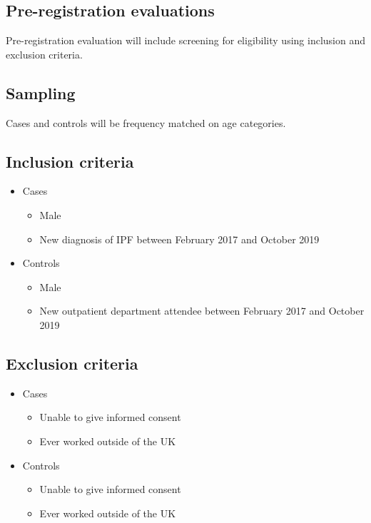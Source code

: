 \documentclass[a4paper,10pt]{article}
\newcommand{\studystart}{February 2017 }
\newcommand{\studyend}{October 2019 }
\begin{document}
\subsection{Pre-registration evaluations}
Pre-registration evaluation will include screening for eligibility using inclusion and exclusion criteria.

\subsection{Sampling}
Cases and controls will be frequency matched on age categories.

\subsection{Inclusion criteria}
\begin{itemize}
 \item Cases \begin{itemize}
        \item Male
        \item New diagnosis of IPF between \studystart and \studyend 
       \end{itemize}
       
  \item Controls \begin{itemize}
        \item Male
        \item New outpatient department attendee between \studystart and \studyend
       \end{itemize}

\end{itemize}


\subsection{Exclusion criteria}
\begin{itemize}
 \item Cases \begin{itemize}
        \item Unable to give informed consent
        \item Ever worked outside of the UK
       \end{itemize}
       
  \item Controls \begin{itemize}
        \item Unable to give informed consent
        \item Ever worked outside of the UK
       \end{itemize}

\end{itemize}
\end{document}
